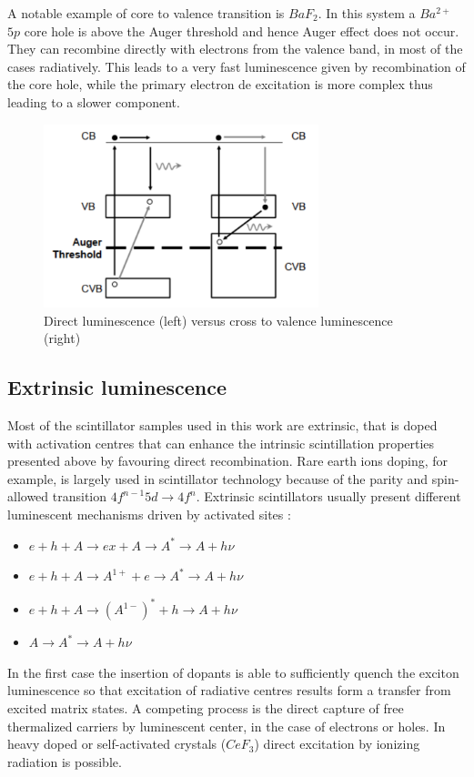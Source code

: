 A notable example of core to valence transition is $BaF_{2}$. In this system a $Ba^{2+}$ $5p$ core hole is above the Auger threshold and hence Auger effect does not occur. They can recombine directly with electrons from the valence band, in most of the cases radiatively.
This leads to a very fast luminescence given by recombination of the core hole, while the primary electron de excitation is more complex thus leading to a slower component.

\begin{figure}
\centering
\includegraphics[width=8cm]{../Pictures/Chapter_2/core_to_valence.pdf}
\caption[Core to valence luminescence]{Direct luminescence (left) versus cross to valence luminescence (right)}
\label{fig:CTV}
\end{figure}
 

\subsection{Extrinsic luminescence}

Most of the scintillator samples used in this work are extrinsic, that is doped with activation centres that can enhance the intrinsic scintillation properties presented above by favouring direct recombination.
Rare earth ions doping, for example, is largely used in scintillator technology because of the parity and spin-allowed transition $4f^{n-1}5d\rightarrow 4f^{n}$. 
Extrinsic scintillators usually present different luminescent mechanisms driven by activated sites \cite{Lecoq2006}:
\begin{itemize}
\item $e + h + A \rightarrow ex + A \rightarrow A^{*} \rightarrow A + h\nu$
\item $e + h + A \rightarrow A^{1+} + e \rightarrow A^{*} \rightarrow A + h\nu$
\item $e + h + A \rightarrow (A^{1-})^{*} + h \rightarrow A + h\nu$
\item $A \rightarrow A^{*} \rightarrow A + h\nu$
\end{itemize}
In the first case the insertion of dopants is able to sufficiently quench the exciton luminescence so that excitation of radiative centres results form a transfer from excited matrix states.
A competing process is the direct capture of free thermalized carriers by luminescent center, in the case of electrons or holes.
In heavy doped or self-activated crystals ($CeF_{3}$) direct excitation by ionizing radiation is possible.

